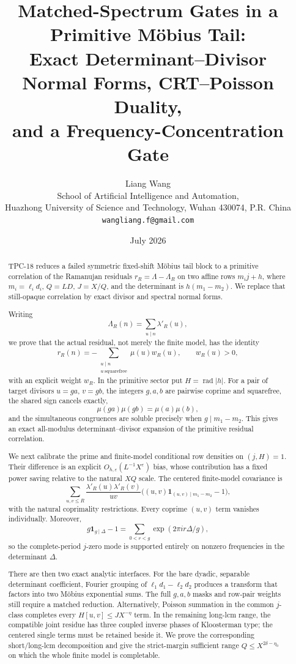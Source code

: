\documentclass[11pt]{article}
\title{\textbf{Matched-Spectrum Gates in a Primitive M\"obius Tail:}\\
\textbf{Exact Determinant--Divisor Normal Forms, CRT--Poisson Duality,}\\
\textbf{and a Frequency-Concentration Gate}}
\author{Liang Wang\\
\small School of Artificial Intelligence and Automation,\\[-0.2em]
\small Huazhong University of Science and Technology, Wuhan 430074, P.R. China\\
\small \texttt{wangliang.f@gmail.com}}
\date{July 2026}
\theoremstyle{definition}
\theoremstyle{remark}
\newcommand{\one}{\mathbf 1}
\newcommand{\eps}{\varepsilon}
\newcommand{\ee}[1]{\exp(2\pi i #1)}
\newcommand{\rad}{\operatorname{rad}}
\begin{document}
\maketitle

\begin{abstract}
TPC-18 reduces a failed symmetric fixed-shift M\"obius tail block to a
primitive correlation of the Ramanujan residuals
\(r_R=\Lambda-\Lambda_R\) on two affine rows
\(m_i j+h\), where \(m_i=\ell_i d_i\), \(Q=LD\),
\(J=X/Q\), and the determinant is \(h(m_1-m_2)\).  We replace that
still-opaque correlation by exact divisor and spectral normal forms.

Writing
\[
 \Lambda_R(n)=\sum_{u\mid n}\lambda'_R(u),
\]
we prove that the actual residual, not merely the finite model, has the
identity
\[
 r_R(n)=-\sum_{\substack{u\mid n\\u\ \mathrm{squarefree}}}
 \mu(u)w_R(u),
 \qquad w_R(u)>0,
\]
with an explicit weight \(w_R\).  In the primitive sector put
\(H=\rad|h|\).  For a pair of target divisors
\(u=ga\), \(v=gb\), the integers \(g,a,b\) are pairwise coprime and
squarefree, the shared sign cancels exactly,
\[
 \mu(ga)\mu(gb)=\mu(a)\mu(b),
\]
and the simultaneous congruences are soluble precisely when
\(g\mid m_1-m_2\).  This gives an exact all-modulus
determinant--divisor expansion of the primitive residual correlation.

We next calibrate the prime and finite-model conditional row densities
on \((j,H)=1\).  Their difference is an explicit
\(O_{h,\eps}(L^{-1}X^\eps)\) bias, whose contribution has a fixed
power saving relative to the natural \(XQ\) scale.  The
centered finite-model covariance is
\[
 \sum_{u,v\le R}\frac{\lambda'_R(u)\lambda'_R(v)}{uv}
 \bigl((u,v)\one_{(u,v)\mid m_1-m_2}-1\bigr),
\]
with the natural coprimality restrictions.  Every coprime
\((u,v)\) term vanishes individually.  Moreover,
\[
 g\one_{g\mid\Delta}-1
 =\sum_{0<r<g}\ee{r\Delta/g},
\]
so the complete-period \(j\)-zero mode is supported entirely on
nonzero frequencies in the determinant \(\Delta\).

There are then two exact analytic interfaces.  For the bare dyadic,
separable determinant coefficient, Fourier grouping of
\(\ell_1d_1-\ell_2d_2\) produces a transform that factors into two
M\"obius exponential sums.  The full \(g,a,b\) masks and row-pair
weights still require a matched reduction.  Alternatively, Poisson
summation in the common \(j\)-class
completes every \(H[u,v]\le JX^{-\eta}\) term.  In the remaining
long-lcm range, the compatible joint residue has three coupled inverse
phases of Kloosterman type; the centered single terms must be retained
beside it.  We prove the corresponding short/long-lcm decomposition
and give the strict-margin sufficient range
\(Q\le X^{2\delta-\eta_0}\) on which the whole finite model is
completable.


\end{abstract}
\end{document}

